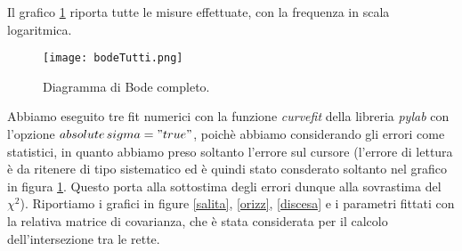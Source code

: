 \documentclass[10pt,a4paper]{article}
\begin{document}



Il grafico \ref{tutteBode} riporta tutte le misure effettuate, con la frequenza in scala logaritmica.

\begin{figure}[!htb]
  \centering
  \texttt{[image: bodeTutti.png]}
\caption{Diagramma di Bode completo.}
\label{tutteBode}
\end{figure}


Abbiamo eseguito tre fit numerici con la funzione \emph{curvefit} della libreria \emph{pylab} con l'opzione \emph{$absolute\,sigma = "true"$}, poichè abbiamo considerando gli errori come statistici, in quanto abbiamo preso soltanto l'errore sul cursore (l'errore di lettura è da ritenere di tipo sistematico ed è quindi stato consderato soltanto nel grafico in figura \ref{tutteBode}. Questo porta alla sottostima degli errori dunque alla sovrastima del $\chi^2$). Riportiamo i grafici in figure \ref{salita}, \ref{orizz}, \ref{discesa} e i parametri fittati con la relativa matrice di covarianza, che è stata considerata per il calcolo dell'intersezione tra le rette.
\end{document}
